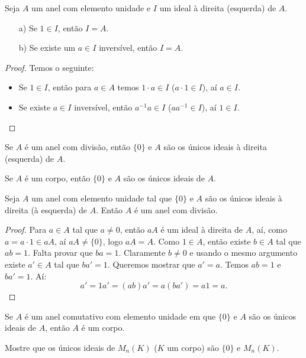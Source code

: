 \documentclass[11pt,twoside,a4paper]{book}
\begin{document}
\begin{proposicao}
Seja $A$ um anel com elemento unidade e $I$ um ideal à direita (esquerda) de $A$.
\begin{itemize}
\item[a)] Se $1\in I$, então $I=A$.
\item[b)] Se existe um $a\in I$ inversível, então $I=A$.
\end{itemize}
\end{proposicao}
\begin{proof}
Temos o seguinte:
\begin{itemize}
\item Se $1\in I$, então para $a\in A$ temos $1\cdot a\in I$ ($a\cdot 1\in I$), aí $a\in I$.
\item Se existe $a\in I$ inversível, então $a^{-1}a\in I$ ($aa^{-1}\in I$), aí $1\in I$.
\end{itemize}
\end{proof}

\begin{corolario}
Se $A$ é um anel com divisão, então $\{0\}$ e $A$ são os únicos ideais à direita (esquerda) de $A$.
\end{corolario}

\begin{corolario}
Se $A$ é um corpo, então $\{0\}$ e $A$ são os únicos ideais de $A$.
\end{corolario}

\begin{proposicao}
Seja $A$ um anel com elemento unidade tal que $\{0\}$ e $A$ são os únicos ideais à direita (à esquerda) de $A$. Então $A$ é um anel com divisão.
\end{proposicao}
\begin{proof}
Para $a\in A$ tal que $a\neq 0$, então $aA$ é um ideal à direita de $A$, aí, como $a=a\cdot 1\in aA$, aí $aA\neq\{0\}$, logo $aA=A$. Como $1\in A$, então existe $b\in A$ tal que $ab=1$. Falta provar que $ba=1$. Claramente $b\neq 0$ e usando o mesmo argumento existe $a'\in A$ tal que $ba'=1$. Queremos mostrar que $a'=a$. Temos $ab=1$ e $ba'=1$. Aí:
\[
a'=1a'=(ab)a'=a(ba')=a1=a.
\]
\end{proof}

\begin{corolario}
Se $A$ é um anel comutativo com elemento unidade em que $\{0\}$ e $A$ são os únicos ideais de $A$, então $A$ é um corpo.
\end{corolario}

\begin{exercicio}
Mostre que os únicos ideais de $M_n(K)$ ($K$ um corpo) são $\{0\}$ e $M_n(K)$.
\end{exercicio}
\end{document}
